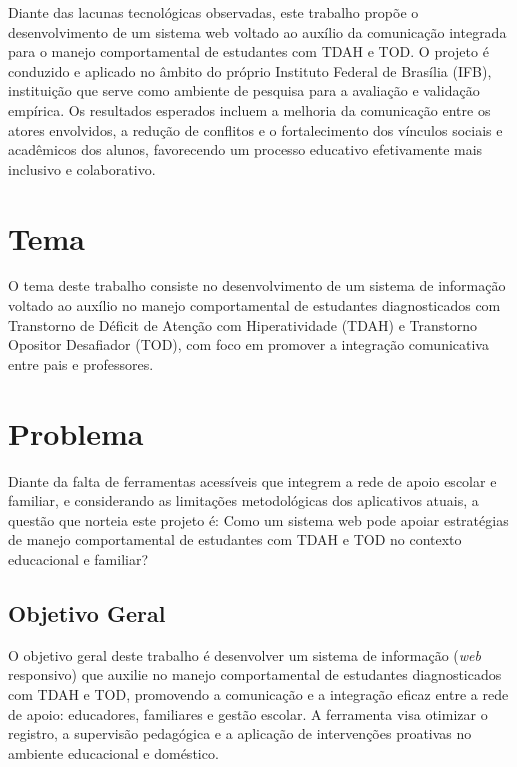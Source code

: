 Diante das lacunas tecnológicas observadas, este trabalho propõe o desenvolvimento de um sistema web voltado ao auxílio da comunicação integrada para o manejo comportamental de estudantes com TDAH e TOD. O projeto é conduzido e aplicado no âmbito do próprio Instituto Federal de Brasília (IFB), instituição que serve como ambiente de pesquisa para a avaliação e validação empírica. Os resultados esperados incluem a melhoria da comunicação entre os atores envolvidos, a redução de conflitos e o fortalecimento dos vínculos sociais e acadêmicos dos alunos, favorecendo um processo educativo efetivamente mais inclusivo e colaborativo.

\vspace{0.3cm}
\section{Tema}

O tema deste trabalho consiste no desenvolvimento de um sistema de informação voltado ao auxílio no manejo comportamental de estudantes diagnosticados com Transtorno de Déficit de Atenção com Hiperatividade (TDAH) e Transtorno Opositor Desafiador (TOD), com foco em promover a integração comunicativa entre pais e professores.

\vspace{0.3cm}
\section{Problema}

Diante da falta de ferramentas acessíveis que integrem a rede de apoio escolar e familiar, e considerando as limitações metodológicas dos aplicativos atuais, a questão que norteia este projeto é: Como um sistema web pode apoiar estratégias de manejo comportamental de estudantes com TDAH e TOD no contexto educacional e familiar?

\vspace{0.3cm}
\subsection{Objetivo Geral}

O objetivo geral deste trabalho é desenvolver um sistema de informação (\textit{web} responsivo) que auxilie no manejo comportamental de estudantes diagnosticados com TDAH e TOD, promovendo a comunicação e a integração eficaz entre a rede de apoio: educadores, familiares e gestão escolar. A ferramenta visa otimizar o registro, a supervisão pedagógica e a aplicação de intervenções proativas no ambiente educacional e doméstico.

